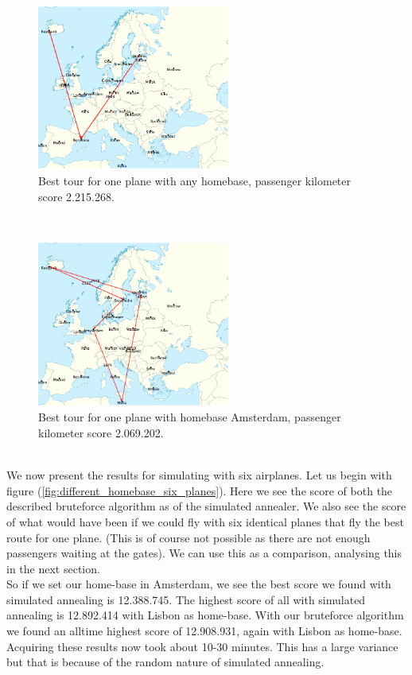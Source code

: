 \documentclass[journal]{IEEEtran}
\begin{document}
\\
\begin{figure}[!h]
\centering
\includegraphics[width=2.5in]{best_tour_one_plane}
\caption{Best tour for one plane with any homebase, passenger kilometer score 2.215.268.}
\label{fig:one_plane}
\end{figure}
\\
\begin{figure}[!h]
\centering
\includegraphics[width=2.5in]{best_tour_one_plane_amsterdam}
\caption{Best tour for one plane with homebase Amsterdam, passenger kilometer score 2.069.202.}
\label{fig:one_plane_amsterdam}
\end{figure}
\\
We now present the results for simulating with six airplanes. Let us begin with figure (\ref{fig:different_homebase_six_planes}). Here we see the score of both the described bruteforce algorithm as of the simulated annealer. We also see the score of what would have been if we could fly with six identical planes that fly the best route for one plane. (This is of course not possible as there are not enough passengers waiting at the gates). We can use this as a comparison, analysing this in the next section. \\
So if we set our home-base in Amsterdam, we see the best score we found with simulated annealing is 12.388.745. The highest score of all with simulated annealing is 12.892.414 with Lisbon as home-base. With our bruteforce algorithm we found an alltime highest score of 12.908.931, again with Lisbon as home-base. Acquiring these results now took about 10-30 minutes. This has a large variance but that is because of the random nature of simulated annealing.\\
\end{document}
